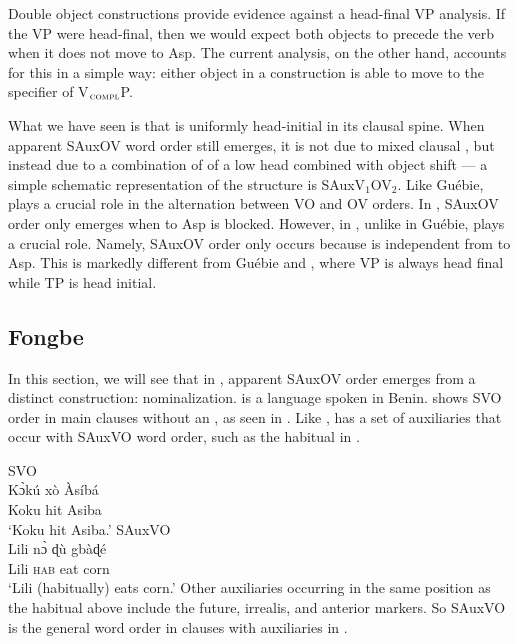 \documentclass[output=paper,newtxmath,modfonts,nonflat,draftmode]{langsci/langscibook}
\begin{document}
\z
Double object constructions provide evidence against a head-final VP analysis. If the  VP were head-final, then we would expect both objects to precede the verb when it does not move to Asp. The current analysis, on the other hand, accounts for this in a simple way: either object in a  construction is able to move to the specifier of V$_\textsc{compl}$P.

What we have seen is that  is uniformly head-initial in its clausal spine. When apparent SAuxOV word order still emerges, it is not due to mixed clausal , but instead due to a combination of  of a low  head combined with object shift --- a simple schematic representation of the structure is SAuxV$_1$OV$_2$. Like Guébie,  plays a crucial role in the alternation between VO and OV orders. In , SAuxOV order only emerges when  to Asp is blocked. However, in , unlike in Guébie,  plays a crucial role. Namely, SAuxOV order only occurs because  is independent from  to Asp. This is markedly different from Guébie and , where VP is always head final while TP is head initial.

\subsection{Fongbe}

 In this section, we will see that in , apparent SAuxOV order emerges from a distinct construction: nominalization.   is a  language spoken in Benin.  shows SVO order in main clauses without an , as seen in . Like ,  has a set of auxiliaries that occur with SAuxVO word order, such as the habitual in .%

\ea \label{ex:Fongbe-SVO}  
{SVO}\\
\ea 
\gll K{{\`ɔ}kú} xò Àsíbá \\
Koku hit Asiba \\
\glt `Koku hit Asiba.' \hfill \citep[][247]{lefebvre2002}
\ex \label{ex:Fongbe-SAuxVO}
 {SAuxVO}\\
\gll Lili {n{\`ɔ}} {ɖù} {gbàɖé}  \\
Lili \textsc{hab} eat corn \\
\glt `Lili (habitually) eats corn.' \hfill \citep[][94]{lefebvre2002}
\z
\z 
Other auxiliaries occurring in the same position as the habitual above include the future, irrealis, and anterior markers. So SAuxVO is the general word order in clauses with auxiliaries in .
\end{document}
